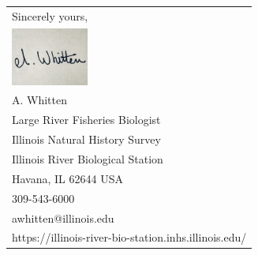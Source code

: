 \documentclass[10pt]{article}\usepackage[]{graphicx}\usepackage[]{color}
\begin{document}
\begin{tabular}{@{}l}
Sincerely yours,\\
\includegraphics [scale=0.05,width=1in]{mysignature.jpg}\\
A. Whitten\\
Large River Fisheries Biologist\\
Illinois Natural History Survey\\
Illinois River Biological Station\\
Havana, IL 62644 USA\\
309-543-6000\\
awhitten@illinois.edu\\
https://illinois-river-bio-station.inhs.illinois.edu/\\
\end{tabular}
\end{document}
